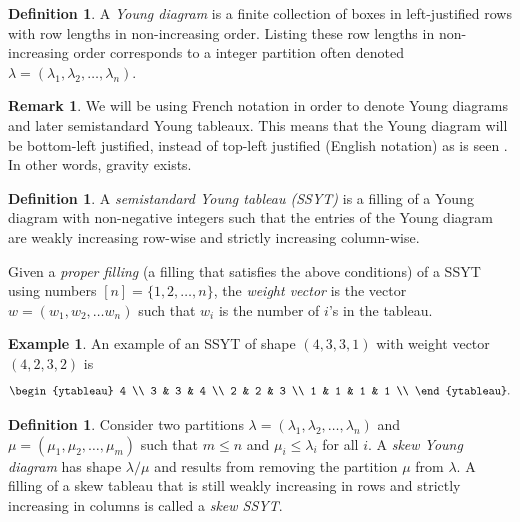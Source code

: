 \documentclass[10pt]{article}
\theoremstyle{plain}
\theoremstyle{definition}
\newtheorem{definition}[thm]{Definition}
\newtheorem{example}[thm]{Example}
\newtheorem{remark}[thm]{Remark}
\begin{document}
\begin{definition}
A \emph{Young diagram} is a finite collection of boxes in left-justified rows with row lengths in non-increasing order. Listing these row lengths in non-increasing order corresponds to a integer partition often denoted $\lambda = (\lambda_1, \lambda_2, \dots, \lambda_n)$.
\end{definition}

\begin{remark}
We will be using French notation in order to denote Young diagrams and later semistandard Young tableaux. This means that the Young diagram will be bottom-left justified, instead of top-left justified (English notation) as is seen \cite{FultonTableaux}. In other words, gravity exists.
\end{remark}

\begin{definition}
A \emph{semistandard Young tableau (SSYT)} is a filling of a Young diagram with non-negative integers such that the entries of the Young diagram are weakly increasing row-wise and strictly increasing column-wise.

Given a \emph{proper filling} (a filling that satisfies the above conditions) of a SSYT using numbers $[n]=\{1, 2, \hdots, n\}$, the \emph{weight vector} is the vector $w = (w_1, w_2, \dots w_n)$ such that $w_i$ is the number of $i$'s in the tableau.

\end{definition}

\begin{example}\label{ex:SSYT}
An example of an SSYT of shape $(4,3,3,1)$ with weight vector $(4,2,3,2)$ is
\[
\begin{ytableau}
4 \\ 
3 & 3 & 4 \\
2 & 2 & 3 \\ 
1 & 1 & 1 & 1 \\ 
\end{ytableau}.
\]
\end{example}

\begin{definition}
Consider two partitions $\lambda = (\lambda_1, \lambda_2, \dots, \lambda_n)$ and $\mu = (\mu_1, \mu_2, \dots, \mu_m)$ such that $m \leq n$ and $\mu_i \leq \lambda_i$ for all $i$. A \emph{skew Young diagram} has shape $\lambda / \mu$ and results from removing the partition $\mu$ from $\lambda$. A filling of a skew tableau that is still weakly increasing in rows and strictly increasing in columns is called a \emph{skew SSYT}. 
\end{definition}
\end{document}
